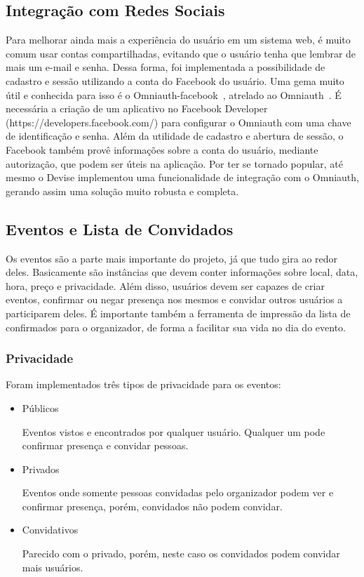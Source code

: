 \subsection{Integração com Redes Sociais}

Para melhorar ainda mais a experiência do usuário em um sistema web, é muito comum usar contas compartilhadas, evitando que o usuário tenha que lembrar de mais um e-mail e senha. Dessa forma, foi implementada a possibilidade de cadastro e sessão utilizando a conta do Facebook do usuário. Uma gema muito útil e conhecida para isso é o Omniauth-facebook~\cite{omniauth-facebook}, atrelado ao Omniauth~\cite{omniauth}. É necessária a criação de um aplicativo no Facebook Developer (https://developers.facebook.com/) para configurar o Omniauth com uma chave de identificação e senha. Além da utilidade de cadastro e abertura de sessão, o Facebook também provê informações sobre a conta do usuário, mediante autorização, que podem ser úteis na aplicação.
Por ter se tornado popular, até mesmo o Devise implementou uma funcionalidade de integração com o Omniauth, gerando assim uma solução muito robusta e completa.

\subsection{Eventos e Lista de Convidados}

Os eventos são a parte mais importante do projeto, já que tudo gira ao redor deles. Basicamente são instâncias que devem conter informações sobre local, data, hora, preço e privacidade. Além disso, usuários devem ser capazes de criar eventos, confirmar ou negar presença nos mesmos e convidar outros usuários a participarem deles. É importante também a ferramenta de impressão da lista de confirmados para o organizador, de forma a facilitar sua vida no dia do evento.

\subsubsection{Privacidade}
Foram implementados três tipos de privacidade para os eventos:

\begin{itemize}
\item Públicos

Eventos vistos e encontrados por qualquer usuário. Qualquer um pode confirmar presença e convidar pessoas.

\item Privados

Eventos onde somente pessoas convidadas pelo organizador podem ver e confirmar presença, porém, convidados não podem convidar.

\item Convidativos

Parecido com o privado, porém, neste caso os convidados podem convidar mais usuários.
\end{itemize}


